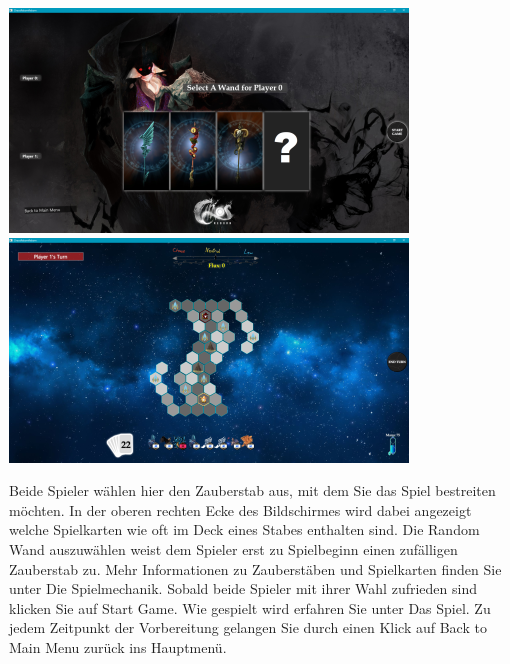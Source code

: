 \documentclass[a4paper,12pt]{scrartcl}
\begin{document}
	\begin{center}\includegraphics[width=\textwidth]{Prog2_EA_V2/screenshots/LokalesSpiel1.png}
	\includegraphics[width=\textwidth]{Prog2_EA_V2/screenshots/Spiel1.png}\end{center}
	Beide Spieler wählen hier den Zauberstab aus, mit dem Sie das Spiel bestreiten möchten. In der oberen rechten Ecke des Bildschirmes wird dabei angezeigt welche Spielkarten wie oft im Deck eines Stabes enthalten sind.
	Die \glqq Random Wand\grqq\hspace{0.05em} auszuwählen weist dem Spieler erst zu Spielbeginn einen zufälligen Zauberstab zu.
	Mehr Informationen zu Zauberstäben und Spielkarten finden Sie unter \glqq Die Spielmechanik\grqq\hspace{0.05em}.
	Sobald beide Spieler mit ihrer Wahl zufrieden sind klicken Sie auf \glqq Start Game\grqq\hspace{0.05em}.
	Wie gespielt wird erfahren Sie unter \glqq Das Spiel\grqq\hspace{0.05em}.
	Zu jedem Zeitpunkt der Vorbereitung gelangen Sie durch einen Klick auf \glqq Back to Main Menu\grqq\hspace{0.05em} zurück ins Hauptmenü.
	
\end{document}
